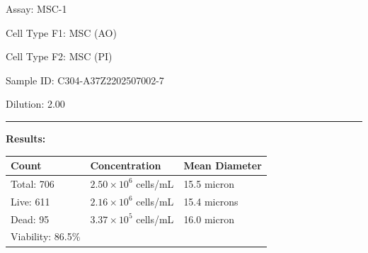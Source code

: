 \documentclass[UTF8,10pt,a4paper,fontset=fandol]{ctexart}
\newcommand{\fieldvalue}[1]{#1}
\begin{document}
\newpage

Assay: %
\fieldvalue{MSC-1}

Cell Type F1: %
\fieldvalue{MSC (AO)}

Cell Type F2: %
\fieldvalue{MSC (PI)}

Sample ID: %
\fieldvalue{C304-A37Z2202507002-7}

Dilution: %
\fieldvalue{2.00}

\noindent\rule{\textwidth}{0.4pt}

\textbf{Results:}

\begin{tabularx}{\textwidth}{@{}lXX@{}}
\textbf{Count} & \textbf{Concentration} & \textbf{Mean Diameter} \\
\hline
\fieldvalue{Total: 706}
&
\fieldvalue{$2.50 \times 10^6$ cells/mL}
&
\fieldvalue{15.5 micron}
\\
\fieldvalue{Live: 611}
&
\fieldvalue{$2.16 \times 10^6$ cells/mL}
&
\fieldvalue{15.4 microns}
\\
\fieldvalue{Dead: 95}
&
\fieldvalue{$3.37 \times 10^5$ cells/mL}
&
\fieldvalue{16.0 micron}
\\
\fieldvalue{Viability: 86.5\%}
&
&
\end{tabularx}

\vspace{0.5em}

\begin{center}
\setlength{\fboxsep}{0pt}
\hspace{0.03\textwidth}

\vspace{0.5em}

\hspace{0.03\textwidth}
\end{center}
\end{document}
